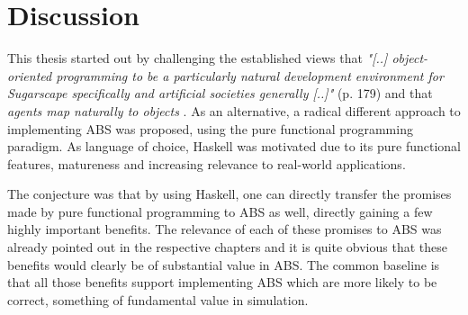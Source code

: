 \chapter{Discussion}
\label{ch:discussion}
This thesis started out by challenging the established views that \textit{"[..] object-oriented programming to be a particularly natural development environment for Sugarscape specifically and artificial societies generally [..]"} \cite{epstein_growing_1996} (p. 179) and that \textit{agents map naturally to objects} \cite{north_managing_2007}. As an alternative, a radical different approach to implementing ABS was proposed, using the pure functional programming paradigm. As language of choice, Haskell was motivated due to its  pure functional features, matureness and increasing relevance to real-world applications. 

The conjecture was that by using Haskell, one can directly transfer the promises made by pure functional programming to ABS as well, directly gaining a few highly important benefits.  The relevance of each of these promises to ABS was already pointed out in the respective chapters and it is quite obvious that these benefits would clearly be of substantial value in ABS. The common baseline is that all those benefits support implementing ABS which are more likely to be correct, something of fundamental value in simulation.

